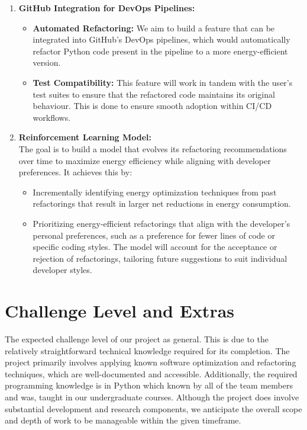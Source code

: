 \documentclass{article}
\begin{document}
\begin{enumerate}
    \item \textbf{GitHub Integration for DevOps Pipelines:}
    \begin{itemize}
        \item \textbf{Automated Refactoring:} We aim to build a feature that can be integrated into GitHub’s DevOps pipelines, which would automatically refactor Python code present in the pipeline to a more energy-efficient version.
        \item \textbf{Test Compatibility:} This feature will work in tandem with the user's test suites to ensure that the refactored code maintains its original behaviour. This is done to ensure smooth adoption within CI/CD workflows.
    \end{itemize}

    \item \textbf{Reinforcement Learning Model:} \\
    The goal is to build a model that evolves its refactoring recommendations over time to maximize energy efficiency while aligning with developer preferences. It achieves this by:
    \begin{itemize}
        \item Incrementally identifying energy optimization techniques from past refactorings that result in larger net reductions in energy consumption.
        \item Prioritizing energy-efficient refactorings that align with the developer's personal preferences, such as a preference for fewer lines of code or specific coding styles. The model will account for the acceptance or rejection of refactorings, tailoring future suggestions to suit individual developer styles.
    \end{itemize}
\end{enumerate}

\section{Challenge Level and Extras}

The expected challenge level of our project as general. This is due to the 
relatively straightforward technical knowledge required for its completion. 
The project primarily involves applying known software optimization and 
refactoring techniques, which are well-documented and accessible. 
Additionally, the required programming knowledge is in Python which known 
by all of the team members and was, taught in our undergraduate courses. 
Although the project does involve substantial development and research components, 
we anticipate the overall scope and depth of work to be manageable within the 
given timeframe.
\end{document}
